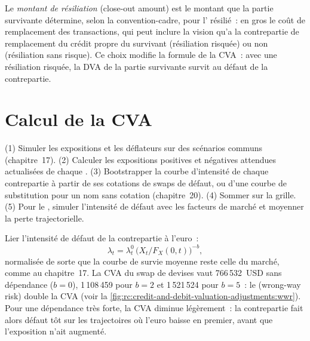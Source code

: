 \begin{definition}\label{def:rc:credit-and-debit-valuation-adjustments:closeout}
Le \emph{montant de résiliation} (close-out amount) est le montant que la partie survivante
détermine, selon la convention-cadre, pour l' résilié~: en gros le coût de
remplacement des transactions, qui peut inclure la vision qu'a la contrepartie de remplacement du
crédit propre du survivant (résiliation risquée) ou non (résiliation sans risque). Ce choix modifie la formule de la CVA~: avec une résiliation risquée, la
DVA de la partie survivante survit au défaut de la contrepartie.
\end{definition}

\section{Calcul de la CVA}

\begin{method}\label{met:rc:credit-and-debit-valuation-adjustments:engine}
(1) Simuler les expositions et les déflateurs sur des scénarios communs (chapitre~17). (2) Calculer les
expositions positives et négatives attendues actualisées de chaque . (3) Bootstrapper
la courbe d'intensité de chaque contrepartie à partir de ses cotations de swaps de défaut, ou d'une courbe de substitution pour un nom
sans cotation (chapitre~20). (4) Sommer sur la grille. (5) Pour le , simuler
l'intensité de défaut avec les facteurs de marché et moyenner la perte trajectorielle.
\end{method}

\begin{example}\label{ex:rc:credit-and-debit-valuation-adjustments:wwr}
Lier l'intensité de défaut de la contrepartie à l'euro~:
\[
\lambda_t = \lambda^0_t\,\bigl(X_t/F_X(0,t)\bigr)^{-b},
\]
normalisée de sorte
que la courbe de survie moyenne reste celle du marché, comme au chapitre~17. La CVA du swap de devises
vaut 766\,532~USD sans dépendance ($b = 0$), 1\,108\,459 pour $b = 2$ et 1\,521\,524 pour
$b = 5$~: le  (wrong-way risk) double la CVA (voir la \cref{fig:rc:credit-and-debit-valuation-adjustments:wwr}).
Pour une dépendance très forte, la CVA diminue légèrement~: la contrepartie fait alors défaut tôt
sur les trajectoires où l'euro baisse en premier, avant que l'exposition n'ait augmenté.
\end{example}

